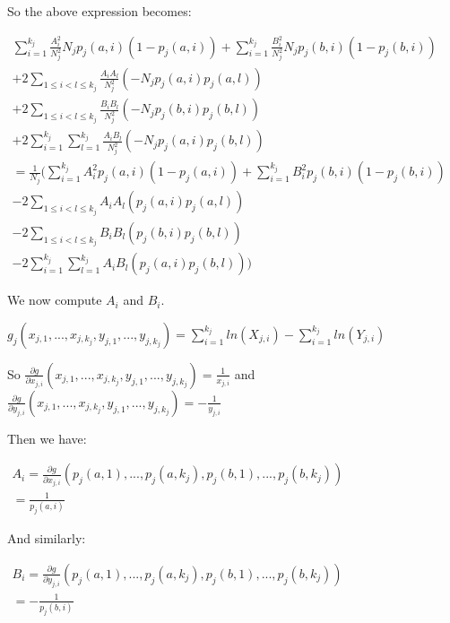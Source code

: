 \documentclass{article}
\begin{document}
So the above expression becomes:

$\displaystyle  \begin{array}{l}
\sum _{i=1}^{k_{j}}\frac{A_{i}^{2}}{N_{j}^{2}} N_{j} p_{j}( a,i)( 1-p_{j}( a,i)) +\sum _{i=1}^{k_{j}}\frac{B_{i}^{2}}{N_{j}^{2}} N_{j} p_{j}( b,i)( 1-p_{j}( b,i))\\
+2\sum _{1\leqslant i< l\leqslant k_{j}}\frac{A_{i} A_{l}}{N_{j}^{2}}( -N_{j} p_{j}( a,i) p_{j}( a,l))\\
+2\sum _{1\leqslant i< l\leqslant k_{j}}\frac{B_{i} B_{l}}{N_{j}^{2}}( -N_{j} p_{j}( b,i) p_{j}( b,l))\\
+2\sum _{i=1}^{k_{j}}\sum _{l=1}^{k_{j}}\frac{A_{i} B_{l}}{N_{j}^{2}}( -N_{j} p_{j}( a,i) p_{j}( b,l))\\
=\frac{1}{N_{j}}(\sum _{i=1}^{k_{j}} A_{i}^{2} p_{j}( a,i)( 1-p_{j}( a,i)) +\sum _{i=1}^{k_{j}} B_{i}^{2} p_{j}( b,i)( 1-p_{j}( b,i))\\
-2\sum _{1\leqslant i< l\leqslant k_{j}} A_{i} A_{l}( p_{j}( a,i) p_{j}( a,l))\\
-2\sum _{1\leqslant i< l\leqslant k_{j}} B_{i} B_{l}( p_{j}( b,i) p_{j}( b,l))\\
-2\sum _{i=1}^{k_{j}}\sum _{l=1}^{k_{j}} A_{i} B_{l}( p_{j}( a,i) p_{j}( b,l)))
\end{array}$



We now compute $\displaystyle A_{i}$ and $\displaystyle B_{i}$.

$\displaystyle g_{j}( x_{j,1} ,...,x_{j,k_{j}} ,y_{j,1} ,...,y_{j,k_{j}}) =\sum _{i=1}^{k_{j}} ln( X_{j,i}) -\sum _{i=1}^{k_{j}} ln( Y_{j,i})$

So $\displaystyle \frac{\partial g}{\partial x_{j,i}}( x_{j,1} ,...,x_{j,k_{j}} ,y_{j,1} ,...,y_{j,k_{j}}) =\frac{1}{x_{j,i}}$ and $\displaystyle \frac{\partial g}{\partial y_{j,i}}( x_{j,1} ,...,x_{j,k_{j}} ,y_{j,1} ,...,y_{j,k_{j}}) =-\frac{1}{y_{j,i}}$



Then we have:

$\displaystyle  \begin{array}{l}
A_{i} =\frac{\partial g}{\partial x_{j,i}}( p_{j}( a,1) ,...,p_{j}( a,k_{j}) ,p_{j}( b,1) ,...,p_{j}( b,k_{j}))\\
=\frac{1}{p_{j}( a,i)}
\end{array}$

And similarly:

$\displaystyle \begin{array}{l}
B_{i} =\frac{\partial g}{\partial y_{j,i}}( p_{j}( a,1) ,...,p_{j}( a,k_{j}) ,p_{j}( b,1) ,...,p_{j}( b,k_{j}))\\
=-\frac{1}{p_{j}( b,i)}
\end{array}$
\end{document}
